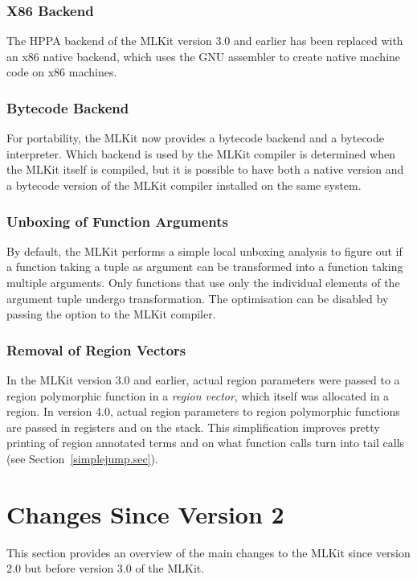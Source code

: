 \documentclass[12pt]{book}
\begin{document}
\subsubsection*{X86 Backend}
The
%
%
%
HPPA backend of the MLKit version 3.0 and earlier has been replaced with an
%
%
%
x86 native backend, which uses the GNU assembler to create native machine code
on x86 machines.

\subsubsection*{Bytecode Backend}
%
%
For portability, the MLKit now provides a bytecode backend and a bytecode
interpreter. Which backend is used by the MLKit compiler is determined when the
MLKit itself is compiled, but it is possible to have both a native version and a
bytecode version of the MLKit compiler installed on the same system.

\subsubsection*{Unboxing of Function Arguments}
%
%
%
%
By default, the MLKit performs a simple local unboxing analysis to figure out if
a function taking a tuple as argument can be transformed into a function taking
multiple arguments. Only functions that use only the individual elements of the
argument tuple undergo transformation. The optimisation can be disabled by
passing the option  to the MLKit compiler.

\subsubsection*{Removal of Region Vectors}
%
%
In the MLKit version 3.0 and earlier, actual region parameters were passed to a
region polymorphic function in a {\em region vector}, which itself was allocated
in a region. In version 4.0, actual region parameters to
%
%
%
region polymorphic functions are passed in registers and on the stack.  This
simplification improves pretty printing of region annotated terms and on what
function calls turn into tail calls (see Section~\ref{simplejump.sec}).

\section{Changes Since Version 2}
%
%
This section provides an overview of the main changes to the MLKit since version
2.0 but before version 3.0 of the MLKit.
\end{document}
